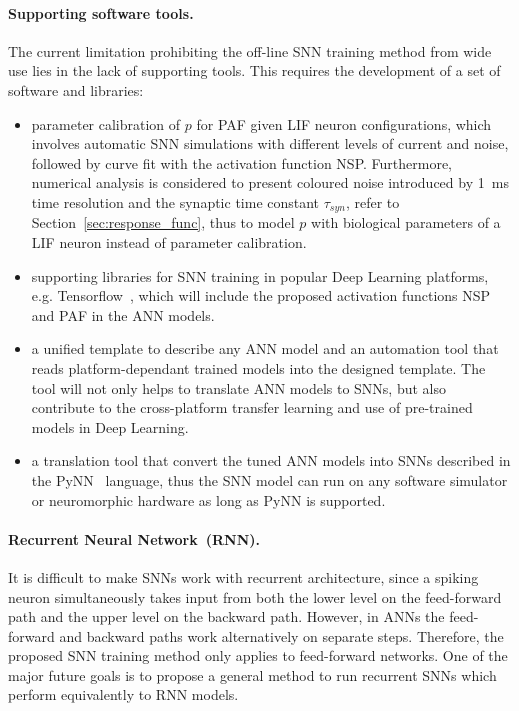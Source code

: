 \paragraph{Supporting software tools.}
The current limitation prohibiting the off-line SNN training method from wide use lies in the lack of supporting tools.
This requires the development of a set of software and libraries:

\begin{itemize}
	\item parameter calibration of $p$ for PAF given LIF neuron configurations, which involves automatic SNN simulations with different levels of current and noise, followed by curve fit with the activation function NSP. 
	Furthermore, numerical analysis is considered to present coloured noise introduced by 1~ms time resolution and the synaptic time constant $\tau_{syn}$, refer to Section~\ref{sec:response_func}, thus to model $p$ with biological parameters of a LIF neuron instead of parameter calibration.
	
	\item supporting libraries for SNN training in popular Deep Learning platforms, e.g. Tensorflow~\citep{tensorflow2015-whitepaper}, which will include the proposed activation functions NSP and PAF in the ANN models.
	
	\item a unified template to describe any ANN model and an automation tool that reads platform-dependant trained models into the designed template.
	The tool will not only helps to translate ANN models to SNNs, but also contribute to the cross-platform transfer learning and use of pre-trained models in Deep Learning.
	
	\item a translation tool that convert the tuned ANN models into SNNs described in the PyNN~\citep{davison2008pynn} language, thus the SNN model can run on any software simulator or neuromorphic hardware as long as PyNN is supported.
\end{itemize}

\paragraph{Recurrent Neural Network~(RNN).}
It is difficult to make SNNs work with recurrent architecture, since a spiking neuron simultaneously takes input from both the lower level on the feed-forward path and the upper level on the backward path.
However, in ANNs the feed-forward and backward paths work alternatively on separate steps.
Therefore, the proposed SNN training method only applies to feed-forward networks.
One of the major future goals is to propose a general method to run recurrent SNNs which perform equivalently to RNN models.

